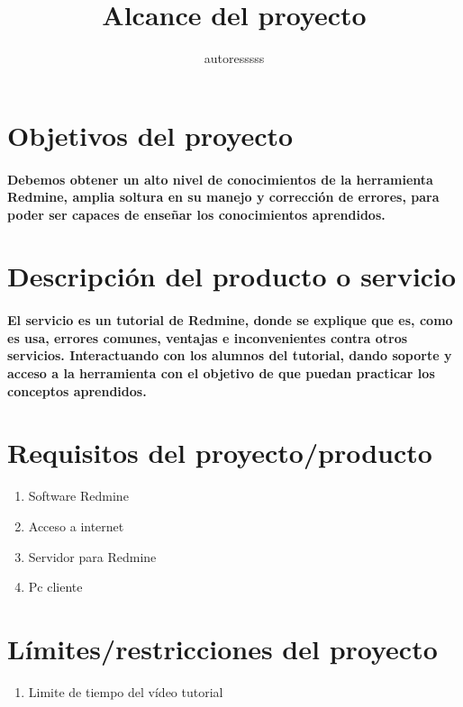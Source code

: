 \documentclass[a4paper,10pt]{article}
\title{Alcance del proyecto}
\author{autoresssss}
\begin{document}
\maketitle



\section*{Objetivos del proyecto}

\paragraph{Debemos obtener un alto nivel de conocimientos de la herramienta Redmine, amplia soltura en su manejo y corrección de errores, para poder ser capaces de enseñar los conocimientos aprendidos.}

\section*{Descripción del producto o servicio}

\paragraph{El servicio es un tutorial de Redmine, donde se explique que es, como es usa, errores comunes, ventajas e inconvenientes contra otros servicios. Interactuando con los alumnos del tutorial, dando soporte y acceso a la herramienta con el objetivo de que puedan practicar los conceptos aprendidos.}

\section*{Requisitos del proyecto/producto}

\begin{enumerate}
	\item Software Redmine
	\item Acceso a internet
	\item Servidor para Redmine
	\item Pc cliente
\end{enumerate}

\section*{Límites/restricciones del proyecto}

\begin{enumerate}
	\item Limite de tiempo del vídeo tutorial
\end{enumerate}
\end{document}
